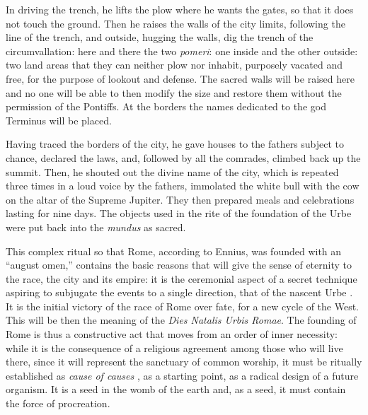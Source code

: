 In driving the trench, he lifts the plow where he wants the gates, so that it does not touch the ground. Then he raises the walls of the city limits, following the line of the trench, and outside, hugging the walls, dig the trench of the circumvallation: here and there the two \emph{pomeri}: one inside and the other outside: two land areas that they can neither plow nor inhabit, purposely vacated and free, for the purpose of lookout and defense. The sacred walls will be raised here and no one will be able to then modify the size and restore them without the permission of the Pontiffs. At the borders the names dedicated to the god Terminus will be placed.

Having traced the borders of the city, he gave houses to the fathers subject to chance, declared the laws, and, followed by all the comrades, climbed back up the summit. Then, he shouted out the divine name of the city, which is repeated three times in a loud voice by the fathers, immolated the white bull with the cow on the altar of the Supreme Jupiter. They then prepared meals and celebrations lasting for nine days. The objects used in the rite of the foundation of the Urbe were put back into the \emph{mundus} as sacred.

This complex ritual so that Rome, according to Ennius, was founded with an ``august omen,'' contains the basic reasons that will give the sense of eternity to the race, the city and its empire: it is the ceremonial aspect of a secret technique aspiring to subjugate the events to a single direction, that of the nascent Urbe . It is the initial victory of the race of Rome over fate, for a new cycle of the West. This will be then the meaning of the \emph{Dies Natalis Urbis Romae}. The founding of Rome is thus a constructive act that moves from an order of inner necessity: while it is the consequence of a religious agreement among those who will live there, since it will represent the sanctuary of common worship, it must be ritually established as \emph{cause of causes} , as a starting point, as a radical design of a future organism. It is a seed in the womb of the earth and, as a seed, it must contain the force of procreation.

